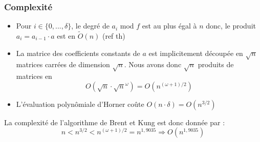 \documentclass[a4paper]{article}
\begin{document}
\subsubsection*{Complexité}
\begin{itemize}
    \item Pour $i \in \{0,...,\delta\}$, le degré de $a_i$ mod $f$ est au plus égal à $n$ donc, le produit $a_i=a_{i-1}\cdot a$ est en $\tilde{O}(n)$ (ref th)
    \item La matrice des coefficients constants de $a$ est implicitement découpée en $\sqrt{n}$ matrices carrées de dimension $\sqrt{n}$.
    Nous avons donc $\sqrt{n}$ produits de matrices en $$O(\sqrt{n}\cdot \sqrt{n}^{\omega})=O(n^{(\omega+1)/2})$$ 
    \item L'évaluation polynômiale d'Horner coûte $O(n\cdot \delta)=O(n^{3/2})$
\end{itemize}
La complexité de l'algorithme de Brent et Kung est donc donnée par :
\[
n < n^{3/2} < n^{(\omega+1)/2}= n^{1,9035} \Longrightarrow O(n^{1,9035})
\]

\newpage
\end{document}
